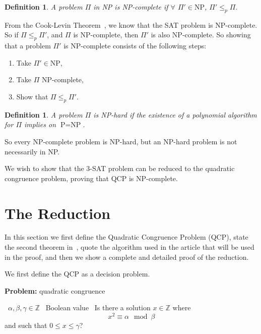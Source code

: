 \documentclass{amsart}
\theoremstyle{plain}
\newcounter{dummy-def}\numberwithin{dummy-def}{section}
\newtheorem{definition}[dummy-def]{Definition}
\newcounter{dummy-prop}\numberwithin{dummy-prop}{section}
\newcounter{dummy-corollary}\numberwithin{dummy-corollary}{section}
\newcounter{dummy-ex}\numberwithin{dummy-ex}{section}
\newcounter{dummy-eg}\numberwithin{dummy-eg}{section}
\newcommand{\p}{\text{P}}
\newcommand{\np}{\text{NP}}
\begin{document}
\begin{definition} A problem $\Pi$ in NP is NP-complete if $\forall$ $\Pi' \in \np$,
  $\Pi'\leq_p\Pi$.
\end{definition}

From the Cook-Levin Theorem~\cite{cook,levin}, we know that the SAT problem is NP-complete. So if
$\Pi\leq_p\Pi'$, and $\Pi$ is NP-complete, then $\Pi'$ is also NP-complete. So showing that a
problem $\Pi'$ is NP-complete consists of the following steps:

\begin{enumerate}
  \item Take $\Pi'\in \np$,
  \item Take $\Pi$ NP-complete,
  \item Show that $\Pi\leq_p\Pi'$.
\end{enumerate}

\begin{definition} A problem $\Pi$ is NP-hard if the existence of a polynomial algorithm for $\Pi$
  implies on $\p=\np$.
\end{definition}

So every NP-complete problem is NP-hard, but an NP-hard problem is not necessarily in NP\@.

We wish to show that the 3-SAT problem can be reduced to the quadratic congruence problem, proving
that QCP is NP-complete.

\section{The Reduction}

In this section we first define the Quadratic Congruence Problem (QCP), state the second theorem
in~\cite{qcp1}, quote the algorithm used in the article that will be used in the proof, and then we
show a complete and detailed proof of the reduction.

We first define the QCP as a decision problem.

\begin{algorithm}[h]
  \caption*{\textbf{Problem:} quadratic congruence}
  \begin{algorithmic}[1]
    \Require\, $\alpha,\beta,\gamma\in\mathbb{Z}$
    \Ensure\, Boolean value
    \Description\, Is there a solution $x\in\mathbb{Z}$ where
    \begin{equation*}
      x^2 \equiv\alpha\mod\beta
    \end{equation*}
    and such that $0\leq x\leq\gamma$?
  \end{algorithmic}
\end{algorithm}
\end{document}
